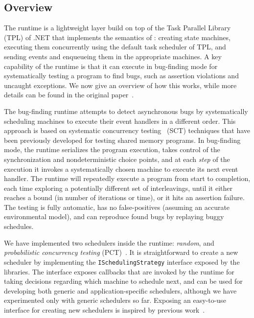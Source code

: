 \subsection{Overview}
\label{sec:psharp:overview}

The \psharp runtime is a lightweight layer build on top of the Task Parallel Library (TPL) of .NET that implements the semantics of \psharp: creating state machines, executing them concurrently using the default task scheduler of TPL, and sending events and enqueueing them in the appropriate machines. A key capability of the \psharp runtime is that it can execute in bug-finding mode for systematically testing a \psharp program to find bugs, such as assertion violations and uncaught exceptions. We now give an overview of how this works, while more details can be found in the original paper~\cite{deligiannis2015psharp}.

The \psharp bug-finding runtime attempts to detect asynchronous bugs by systematically scheduling machines to execute their event handlers in a different order. This approach is based on systematic concurrency testing~\cite{godefroid1997verisoft, musuvathi2008finding, emmi2011delay} (SCT) techniques that have been previously developed for testing shared memory programs. In bug-finding mode, the \psharp runtime serializes the program execution, takes control of the synchronization and nondeterministic choice points, and at each \emph{step} of the execution it invokes a systematically chosen \psharp machine to execute its next event handler. The \psharp runtime will repeatedly execute a program from start to completion, each time exploring a potentially different set of interleavings, until it either reaches a bound (in number of iterations or time), or it hits an assertion failure. The testing is fully automatic, has no false-positives (assuming an accurate environmental model), and can reproduce found bugs by replaying buggy schedules.

We have implemented two schedulers inside the \psharp runtime: \emph{random}, and \emph{probabilistic concurrency testing} (PCT)~\cite{burckhardt2010pct}. It is straightforward to create a new scheduler by implementing the \texttt{ISchedulingStrategy} interface exposed by the \psharp libraries. The interface exposes callbacks that are invoked by the \psharp runtime for taking decisions regarding which machine to schedule next, and can be used for developing both generic and application-specific schedulers, although we have experimented only with generic schedulers so far. Exposing an easy-to-use interface for creating new schedulers is inspired by previous work~\cite{desai2015tr}.

